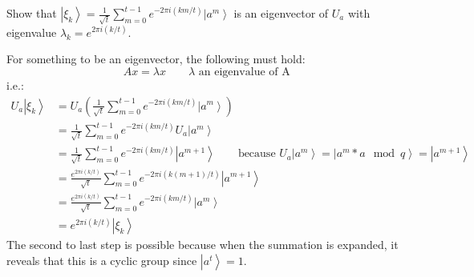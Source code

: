 \documentclass{exam} %
\newcommand{\NN}{\mathbb{N}}
\theoremstyle{plain}
\theoremstyle{definition}
\theoremstyle{remark}
\newcommand{\ds}[1]{ \displaystyle{#1} }
\numberwithin{equation}{section}  %
\newcommand{\ket}[1]{ \left| #1 \right> }
\begin{document}
\begin{questions}
\question Show that
$\ds{
  \ket{\xi_k}
  = \frac{1}{\sqrt{t}} \sum_{m=0}^{t-1} e^{-2\pi i (km/t)} \ket{a^m}
}$
is an eigenvector of $U_a$ with eigenvalue $\lambda_k = e^{2\pi i (k/t)}$.
\begin{solution}
  For something to be an eigenvector, the following must hold:
  \[
    Ax = \lambda x \qquad \lambda \text{ an eigenvalue of A }
  \]
  i.e.:
  \begin{align*}
    U_a\ket{\xi_k} 
    &= U_a(\frac{1}{\sqrt{t}} \sum_{m=0}^{t-1} e^{-2\pi i (km/t)} \ket{a^m})\\
    &= \frac{1}{\sqrt{t}} \sum_{m=0}^{t-1} e^{-2\pi i (km/t)} U_a\ket{a^m}\\
    &= \frac{1}{\sqrt{t}} \sum_{m=0}^{t-1} e^{-2\pi i (km/t)} \ket{a^{m+1}}
    \qquad \text{because } U_a\ket{a^m} = \ket{{a^{m}*a\mod q}} = \ket{a^{m+1}}\\
    &= \frac{e^{2\pi i (k/t)}}{\sqrt{t}} \sum_{m=0}^{t-1} e^{-2\pi i (k(m+1)/t)} 
    \ket{a^{m+1}}\\
    &= \frac{e^{2\pi i (k/t)}}{\sqrt{t}} \sum_{m=0}^{t-1} e^{-2\pi i (km/t)} 
    \ket{a^{m}}\\
    &= e^{2\pi i (k/t)}\ket{\xi_k}
  \end{align*}
  The second to last step is possible because when the summation is expanded,
  it reveals that this is a cyclic group since $\ket{a^t} = 1$.
\end{solution}
\question {}
\end{questions}
\end{document}
